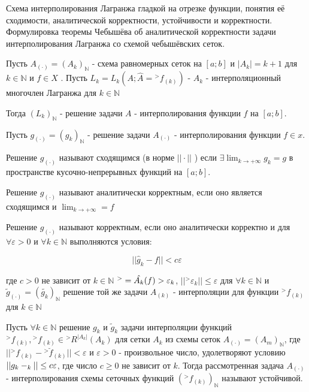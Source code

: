 \documentclass[__main__.tex]{subfiles}
\begin{document}
Схема интерполирования Лагранжа гладкой на отрезке функции, понятия её сходимости, аналитической корректности, устойчивости и корректности. Формулировка теоремы Чебышёва об аналитической корректности задачи интерполирования Лагранжа со схемой чебышёвских сеток.\\

\begin{definition}
Пусть $A_{(\cdot)} = (A_k)_{\mathbb{N}}$ - схема равномерных сеток на $[a; b]$ и $|A_k| = k + 1$ для  $k \in \mathbb{N}$ и $f \in X$ . Пусть $L_k = L_k(A; \hat{A} = {}^{>}f_{(k)})$ - $A_k$ - интерполяционный многочлен Лагранжа для $k \in \mathbb{N}$

Тогда $(L_k)_{\mathbb{N}}$ - решение задачи $A$ - интерполирования функции $f$ на $[a; b]$. 

\end{definition}

\begin{definition}
Пусть $g_{(\cdot)} = (g_k)_{\mathbb{N}}$ - решение задачи $A_{(\cdot)}$ - интерполирования функции $f \in x$.
\end{definition}

\begin{definition}
Решение $g_{(\cdot)}$ называют сходящимся (в норме $||\cdot||$ ) если $\exists \lim_{k \to +\infty} g_k = g$ в пространстве кусочно-непрерывных функций на $[a; b]$.
\end{definition}

\begin{definition}
Решение  $g_{(\cdot)}$  называют аналитически корректным, если оно является сходящимся и $\lim_{k \to +\infty} = f$
\end{definition}

\begin{definition}
Решение  $g_{(\cdot)}$ называют корректным, если оно аналитически корректно и для $\forall \varepsilon > 0$ и $\forall k \in \mathbb{N}$ выполняются условия:

$$||\hat{g}_k - f|| < c\varepsilon$$

где $c > 0$ не зависит от $k \in \mathbb{N}$ ${}^{>}\title{f} = \hat{A_k}(f) > \varepsilon_k$, $||{}^{>}\varepsilon_k|| \le \varepsilon$ для $\forall k \in \mathbb{N}$ и $\tilde{g}_{(\cdot)} = (\tilde{g_k})_{\mathbb{N}}$ решение той же задачи $A_{(k)}$ - интерполяции для функции ${}^{>}f_{(k)}$ для $k \in \mathbb{N}$ 
\end{definition}

\begin{definition}
Пусть $\forall k \in \mathbb{N}$ решение $g_k$ и $\tilde{g}_k$ задачи интерполяции функций ${}^{>}f_{(k)}, {}^{>}f_{(k)} \in {}^{>}R^{|A_k|}(A_k)$ для сетки $A_k$ из схемы сеток $A_{(\cdot)} = (A_m)_{\mathbb{N}}$, где $||{}^{>}f_{(k)} - {}^{>}\breve{f}_{(k)}|| < \varepsilon$ и $\varepsilon > 0$ - произвольное число, удолетворяют условию $||g_k - \title{g}_k|| \le c\varepsilon$, где число $c \ge 0$ не зависит от $k$. Тогда рассмотренная задача $A_{(\cdot)}$ - интерполирования схемы сеточных функций $({}^{>}f_{(k)})_{\mathbb{N}}$ называют устойчивой.
\end{definition}
\end{document}
